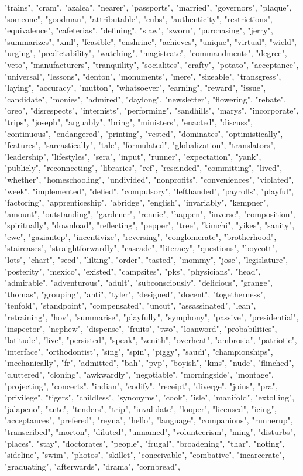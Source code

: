 "trains", "cram", "azalea", "nearer", "passports", "married", "governors", "plaque", "someone", "goodman", "attributable", "cubs", "authenticity", "restrictions", "equivalence", "cafeterias", "defining", "slaw", "sworn", "purchasing", "jerry", "summarizes", "xml", "feasible", "enshrine", "achieves", "unique", "virtual", "wield", "urging", "predictability", "watching", "magistrate", "commandments", "degree", "veto", "manufacturers", "tranquility", "socialites", "crafty", "potato", "acceptance", "universal", "lessons", "denton", "monuments", "mere", "sizeable", "transgress", "laying", "accuracy", "mutton", "whatsoever", "earning", "reward", "issue", "candidate", "monies", "admired", "daylong", "newsletter", "flowering", "rebate", "oreo", "disrespects", "internists", "performing", "sandhills", "marys", "incorporate", "trips", "joseph", "arguably", "bring", "ministers", "enacted", "discuss", "continuous", "endangered", "printing", "vested", "dominates", "optimistically", "features", "sarcastically", "tale", "formulated", "globalization", "translators", "leadership", "lifestyles", "sera", "input", "runner", "expectation", "yank", "publicly", "reconnecting", "libraries", "ref", "rescinded", "committing", "lived", "whether", "homeschooling", "undivided", "nonprofits", "conveniences", "violated", "week", "implemented", "defied", "compulsory", "lefthanded", "payrolls", "playful", "factoring", "apprenticeship", "abridge", "english", "invariably", "kempner", "amount", "outstanding", "gardener", "rennie", "happen", "inverse", "composition", "spiritually", "download", "reflecting", "pepper", "tree", "kimchi", "yikes", "sanity", "ewe", "gaziantep", "incentivize", "reversing", "conglomerate", "brotherhood", "staircases", "straightforwardly", "cascade", "literacy", "questions", "boycott", "lots", "chart", "seed", "lilting", "order", "tasted", "mommy", "jose", "legislature", "posterity", "mexico", "existed", "campsites", "pks", "physicians", "head", "admirable", "adventurous", "adult", "subconsciously", "delicious", "grange", "thomas", "grouping", "anti", "tyler", "designed", "docent", "togetherness", "tenfold", "standpoint", "compensated", "uncut", "assassinated", "lean", "retraining", "hov", "summarise", "playfully", "symphony", "passive", "presidential", "inspector", "nephew", "dispense", "fruits", "two", "loanword", "probabilities", "latitude", "live", "persisted", "speak", "zenith", "overheat", "ambrosia", "patriotic", "interface", "orthodontist", "sing", "spin", "piggy", "saudi", "championships", "mechanically", "fr", "admitted", "bah", "pvp", "boyish", "kms", "nude", "flinched", "cluttered", "cloning", "awkwardly", "negotiable", "morningside", "montage", "projecting", "concerts", "indian", "codify", "receipt", "diverge", "joins", "pra", "privilege", "tigers", "childless", "synonyms", "cook", "isle", "manifold", "extolling", "jalapeno", "ante", "tenders", "trip", "invalidate", "looper", "licensed", "icing", "acceptances", "prefered", "reyna", "hello", "language", "companions", "runnerup", "transcribed", "morton", "diluted", "unnamed", "volunteerism", "ming", "disturbs", "places", "stay", "doctorates", "people", "frugal", "broadening", "thar", "noting", "sideline", "swim", "photos", "skillet", "conceivable", "combative", "incarcerate", "graduating", "afterwards", "drama", "cornbread", 